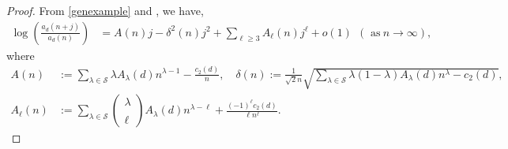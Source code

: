 \documentclass[10pt,a4paper]{amsart}
\renewcommand{\binom}[2]{\left(\begin{smallmatrix}#1\\\\#2\end{smallmatrix}\right)}
\renewcommand{\d}{{\delta}}
\renewcommand{\l}{\lambda}
\begin{document}
\begin{proof}
From \eqref{genexample} and , we have,
\begin{align}\label{neweqn9}
\log\left(\frac{a_d(n+j)}{a_d(n)}\right)
&=A(n)j-\d^2(n)j^2+\sum_{\ell\ge 3}A_{\ell}(n)j^\ell+o(1)\ \ \left(\text{ as}\ n\to \infty\right),
\end{align}
where 
\begin{align*}
A(n)&:=\sum_{\l\in \mathcal{S}}\l A_{\l}(d)n^{\l-1}-\frac{c_2(d)}{n},\quad \d(n):=\frac1{\sqrt2n}\sqrt{\sum_{\l\in \mathcal{S}}\l(1-\l) A_{\l}(d)n^{\l}-c_2(d)},\\
A_{\ell}(n)&:=\sum_{\l\in \mathcal{S}}\binom{\l}{\ell}A_{\l}(d)n^{\l-\ell}+\frac{(-1)^\ell c_2(d)}{\ell n^\ell}.
\end{align*}


\end{proof}
\end{document}
